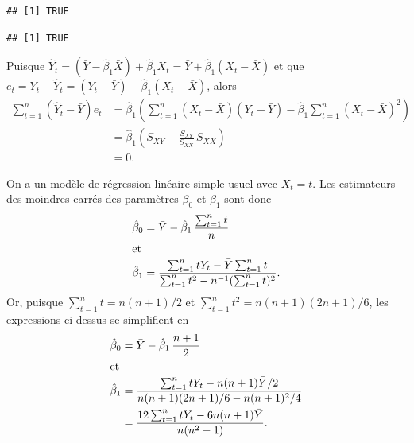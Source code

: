 \begin{solution}{2.3}
\begin{enumerate}
\begin{knitrout}
\begin{kframe}
\begin{alltt}
 \hlopt{+} 
\end{alltt}
\begin{verbatim}
## [1] TRUE
\end{verbatim}
\begin{alltt}
\hlstd{(}\hlopt{$}\hlopt{/}
\end{alltt}
\begin{verbatim}
## [1] TRUE
\end{verbatim}
\end{kframe}
\end{knitrout}
    \end{enumerate}
  
\end{solution}
\begin{solution}{2.4}
    Puisque $\hat{Y}_t = (\bar{Y} - \hat{\beta}_1 \bar{X}) +
    \hat{\beta}_1 X_t = \bar{Y} + \hat{\beta}_1 (X_t - \bar{X})$ et
    que $e_t = Y_t - \hat{Y}_t = (Y_t - \bar{Y}) - \hat{\beta}_1 (X_t
    - \bar{X})$, alors
    \begin{align*}
      \sum_{t = 1}^n (\hat{Y}_t - \bar{Y}) e_t
      &= \hat{\beta}_1
      \left(
        \sum_{t=1}^n (X_t - \bar{X})(Y_t - \bar{Y}) -
        \hat{\beta}_1 \sum_{t = 1}^n (X_t - \bar{X})^2
      \right) \\
      & = \hat{\beta}_1
      \left(
        S_{XY} - \frac{S_{XY}}{S_{XX}}\, S_{XX}
      \right) \\
      & = 0.
    \end{align*}
  
\end{solution}
\begin{solution}{2.5}
    On a un modèle de régression linéaire simple usuel avec $X_t =
    t$. Les estimateurs des moindres carrés des paramètres $\beta_0$ et
    $\beta_1$ sont donc
    \begin{align*}
      \hat{\beta}_0
      &= \bar{Y} - \hat{\beta}_1\, \frac{\sum_{t = 1}^n t}{n} \\
      \intertext{et}
      \hat{\beta}_1
      &= \frac{\sum_{t = 1}^n t Y_t - \bar{Y} \sum_{t = 1}^n t}{\sum_{t
          = 1}^n t^2 - n^{-1} (\sum_{t = 1}^n t)^2}.
    \end{align*}
    Or, puisque $\sum_{t = 1}^n t = n(n + 1)/2$ et $\sum_{t = 1}^n t^2
    = n(n + 1)(2n + 1)/6$, les expressions ci-dessus se simplifient en
    \begin{align*}
      \hat{\beta}_0
      & = \bar{Y} - \hat{\beta}_1\, \frac{n + 1}{2} \\
      \intertext{et}
      \hat{\beta}_1
      & = \frac{\sum_{t=1}^n t Y_t - n(n + 1) \bar{Y}/2}{n(n + 1)(2n +
        1)/6 - n(n + 1)^2/4} \\
      & = \frac{12 \sum_{t=1}^n t Y_t - 6 n (n + 1) \bar{Y}}{n (n^2 - 1)}.
    \end{align*}
  
\end{solution}
